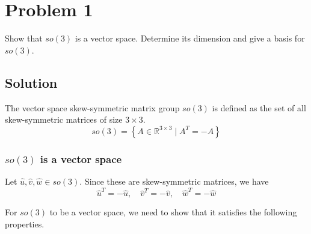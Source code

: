 \section*{Problem 1}

Show that \( so(3) \) is a vector space.
Determine its dimension and give a basis for \( so(3) \).

\subsection*{Solution}

The vector space skew-symmetric matrix group \( so(3) \) is defined as the set of all skew-symmetric matrices of size \( 3 \times 3 \).
\begin{equation*}
    so(3) = \left \{ A \in \mathbb{R}^{3 \times 3} \mid A^{T}=-A \right \}
\end{equation*}

\subsubsection*{\(so(3)\) is a vector space}

Let \( \hat u, \hat v, \hat w \in so(3) \).
Since these are skew-symmetric matrices, we have
\[
    \hat u^{T} = -\hat u, \quad \hat v^{T} = -\hat v, \quad \hat w^{T} = -\hat w
\]

For \( so(3) \) to be a vector space, we need to show that it satisfies the following properties.

